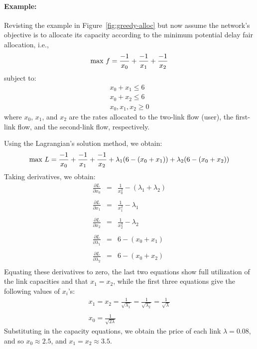 \documentclass{article}
\begin{document}
\paragraph*{Example:} 
Revisting the example in Figure~\ref{fig:greedy-alloc} but now assume the network's objective is to allocate its capacity according to the minimum potential delay fair allocation, i.e., 
\begin{eqnarray*}
{\rm max} \ f = \frac{-1}{x_0} + \frac{-1}{x_1} + \frac{-1}{x_2} 
\end{eqnarray*}
subject to:
\begin{eqnarray*}
x_0 + x_1 \leq 6 \\
x_0 + x_2 \leq 6 \\
x_0, x_1, x_2 \geq 0
\end{eqnarray*}
where $x_0$, $x_1$, and $x_2$ are the rates allocated to the two-link flow (user), the first-link flow, and the second-link flow, respectively. 

Using the Lagrangian's solution method, we obtain:
\begin{eqnarray*}
{\rm max}\ L =  \frac{-1}{x_0} + \frac{-1}{x_1} + \frac{-1}{x_2} + \lambda_1(6- (x_0+x_1)) + \lambda_2(6- (x_0+x_2))
\end{eqnarray*}
Taking derivatives, we obtain:
\[
\begin{array}{ccc}
  \frac{\partial L}{\partial x_0} & =   & \frac{1}{x_0^2} - (\lambda_1+ \lambda_2)   \\ \\
  \frac{\partial L}{\partial x_1} & =   & \frac{1}{x_1^2} - \lambda_1   \\ \\
  \frac{\partial L}{\partial x_2} & =   & \frac{1}{x_2^2} - \lambda_2   \\ \\
  \frac{\partial L}{\partial \lambda_1} & =  & 6 -   (x_0+x_1)\\ \\
  \frac{\partial L}{\partial \lambda_2} & =  & 6 -   (x_0+x_2) \\
\end{array}
\]
Equating these derivatives to zero, the last two equations show full utilization of the link capacities and that $x_1=x_2$, while the first three equations give the following values of $x_i$'s: 
\begin{eqnarray*}
x_1 = x_2 = \frac{1}{\sqrt{\lambda_1}} = \frac{1}{\sqrt{\lambda_2}} = \frac{1}{\sqrt{\lambda}} \\ \\
x_0 = \frac{1}{\sqrt{2 \lambda}}
\end{eqnarray*}
Substituting in the capacity equations, we obtain the price of each link $\lambda = 0.08$,
and so $x_0 \approx 2.5$, and $x_1 = x_2 \approx 3.5 $. 
\end{document}
